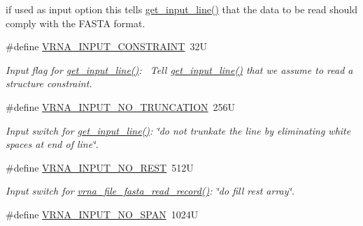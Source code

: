 \begin{DoxyCompactItemize}
\begin{DoxyCompactList}
if used as input option this tells \hyperlink{group__utils_ga8ef1835eb83f542396f59f0b205965e5}{get\+\_\+input\+\_\+line()} that the data to be read should comply with the F\+A\+S\+TA format. \end{DoxyCompactList}\item 
\#define \hyperlink{group__utils_gac08a9df45b9721b97a47dbfe7a6e5f85}{V\+R\+N\+A\+\_\+\+I\+N\+P\+U\+T\+\_\+\+C\+O\+N\+S\+T\+R\+A\+I\+NT}~32U
\begin{DoxyCompactList}\small\item\em Input flag for \hyperlink{group__utils_ga8ef1835eb83f542396f59f0b205965e5}{get\+\_\+input\+\_\+line()}\+:~\newline
Tell \hyperlink{group__utils_ga8ef1835eb83f542396f59f0b205965e5}{get\+\_\+input\+\_\+line()} that we assume to read a structure constraint. \end{DoxyCompactList}\item 
\mbox{\label{group__utils_ga086742158293217a46ae2f71bb296937}} 
\#define \hyperlink{group__utils_ga086742158293217a46ae2f71bb296937}{V\+R\+N\+A\+\_\+\+I\+N\+P\+U\+T\+\_\+\+N\+O\+\_\+\+T\+R\+U\+N\+C\+A\+T\+I\+ON}~256U
\begin{DoxyCompactList}\small\item\em Input switch for \hyperlink{group__utils_ga8ef1835eb83f542396f59f0b205965e5}{get\+\_\+input\+\_\+line()}\+: {\itshape \char`\"{}do not trunkate the line by eliminating white spaces at end of line\char`\"{}}. \end{DoxyCompactList}\item 
\mbox{\label{group__utils_ga7a2e8c50a0c7ce82e60da1016e1367fd}} 
\#define \hyperlink{group__utils_ga7a2e8c50a0c7ce82e60da1016e1367fd}{V\+R\+N\+A\+\_\+\+I\+N\+P\+U\+T\+\_\+\+N\+O\+\_\+\+R\+E\+ST}~512U
\begin{DoxyCompactList}\small\item\em Input switch for \hyperlink{group__file__utils_ga8cfb7e271efc9e1f34640acb85475639}{vrna\+\_\+file\+\_\+fasta\+\_\+read\+\_\+record()}\+: {\itshape \char`\"{}do fill rest array\char`\"{}}. \end{DoxyCompactList}\item 
\mbox{\label{group__utils_ga0de536599b881c787b0943a2671da476}} 
\#define \hyperlink{group__utils_ga0de536599b881c787b0943a2671da476}{V\+R\+N\+A\+\_\+\+I\+N\+P\+U\+T\+\_\+\+N\+O\+\_\+\+S\+P\+AN}~1024U

\end{DoxyCompactItemize}
